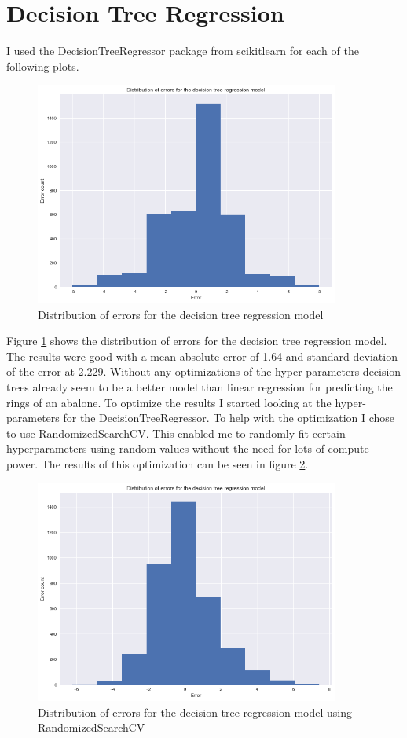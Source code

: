 \section{Decision Tree Regression}

I used the DecisionTreeRegressor package from scikitlearn for each of the following plots. 
\begin{figure}[H]
  \centering
  \includegraphics[scale=0.5,width=100mm]{./images/abalone-decision-tree-regression-start.png}
  \caption{Distribution of errors for the decision tree regression model}
  \label{fig:abalone-decision-tree-regression-start}
\end{figure}
Figure \ref{fig:abalone-decision-tree-regression-start} shows the distribution of errors for the decision tree regression model. The results were good with a mean absolute error of 1.64 and standard deviation of the error at 2.229. Without any optimizations of the hyper-parameters decision trees already seem to be a better model than linear regression for predicting the rings of an abalone. To optimize the results I started looking at the hyper-parameters for the DecisionTreeRegressor. To help with the optimization I chose to use RandomizedSearchCV. This enabled me to randomly fit certain hyperparameters using random values without the need for lots of compute power. The results of this optimization can be seen in figure \ref{fig:abalone-decision-tree-regression-randomcv}.
\begin{figure}[H]
  \centering
  \includegraphics[scale=0.5,width=100mm]{./images/abalone-decision-tree-regression-randomcv.png}
  \caption{Distribution of errors for the decision tree regression model using RandomizedSearchCV}
  \label{fig:abalone-decision-tree-regression-randomcv}
\end{figure}
